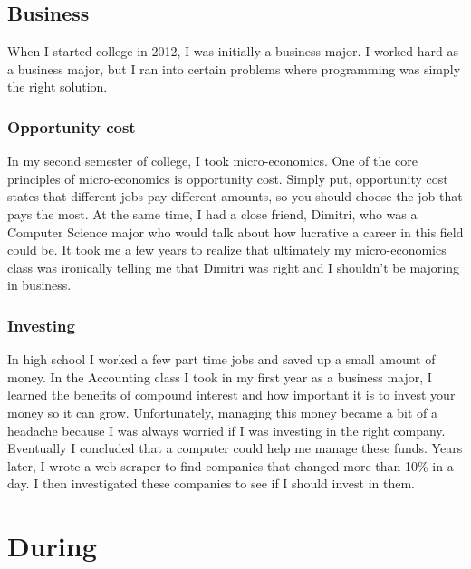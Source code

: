 \documentclass[titlepage]{article}
\begin{document}
\iffalse
\subsection{St. Luke's}

Most people in IT are into it from a young age, not me\dots
\fi

\subsection{Business}

When I started college in 2012, I was initially a business major. I worked hard as a business major, but I ran into certain problems where programming was simply the right solution.

\subsubsection{Opportunity cost}

In my second semester of college, I took micro-economics. One of the core principles of micro-economics is opportunity cost. Simply put, opportunity cost states that different jobs pay different amounts, so you should choose the job that pays the most. At the same time, I had a close friend, Dimitri, who was a Computer Science major who would talk about how lucrative a career in this field could be. It took me a few years to realize that ultimately my micro-economics class was ironically telling me that Dimitri was right and I shouldn't be majoring in business.

\subsubsection{Investing}

In high school I worked a few part time jobs and saved up a small amount of money. In the Accounting class I took in my first year as a business major, I learned the benefits of compound interest and how important it is to invest your money so it can grow. Unfortunately, managing this money became a bit of a headache because I was always worried if I was investing in the right company. Eventually I concluded that a computer could help me manage these funds. Years later, I wrote a web scraper to find companies that changed more than 10\% in a day. I then investigated these companies to see if I should invest in them.

\section{During}
\end{document}
